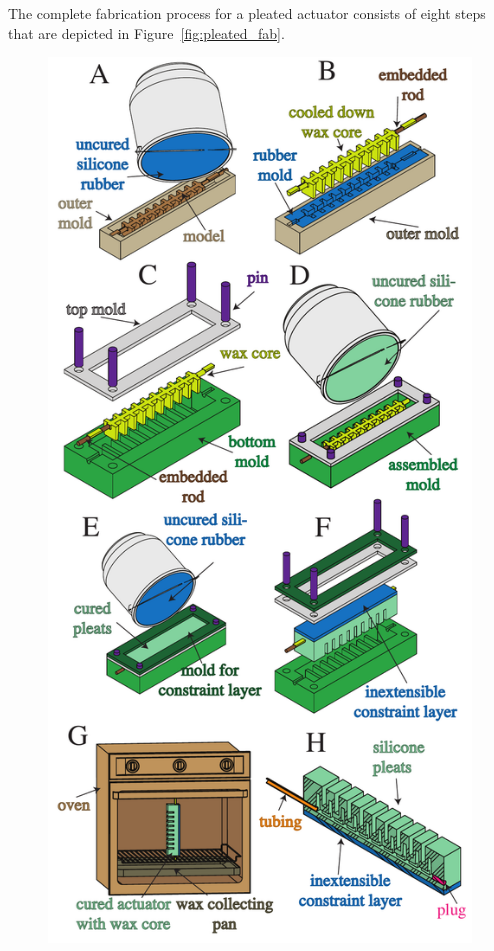 The complete fabrication process for a pleated actuator consists of eight steps that are depicted in Figure~\ref{fig:pleated_fab}.
\begin{figure}[htb]
\centering
   \includegraphics[width=\columnwidth]{figures/fabrication/fab_pleated_process.pdf}

\end{figure}
